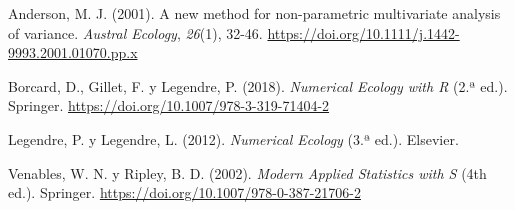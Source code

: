 \documentclass[
  12pt,
  man,
  floatsintext]{apa7}
\newlength{\cslhangindent}
\newenvironment{CSLReferences}[2] %
 {\begin{list}{}{%
  \setlength{\itemindent}{0pt}
  \setlength{\leftmargin}{0pt}
  \setlength{\parsep}{0pt}
  \ifodd #1
   \setlength{\leftmargin}{\cslhangindent}
   \setlength{\itemindent}{-1\cslhangindent}
  \fi
  \setlength{\itemsep}{#2\baselineskip}}}
 {\end{list}}
\begin{document}
\label{refs}
\begin{CSLReferences}{1}{0}
Anderson, M. J. (2001). A new method for non-parametric multivariate analysis of variance. \emph{Austral Ecology}, \emph{26}(1), 32-46. \url{https://doi.org/10.1111/j.1442-9993.2001.01070.pp.x}

Borcard, D., Gillet, F. y Legendre, P. (2018). \emph{Numerical Ecology with R} (2.ª ed.). Springer. \url{https://doi.org/10.1007/978-3-319-71404-2}

Legendre, P. y Legendre, L. (2012). \emph{Numerical Ecology} (3.ª ed.). Elsevier.

Venables, W. N. y Ripley, B. D. (2002). \emph{Modern Applied Statistics with S} (4th ed.). Springer. \url{https://doi.org/10.1007/978-0-387-21706-2}

\end{CSLReferences}
\end{document}
